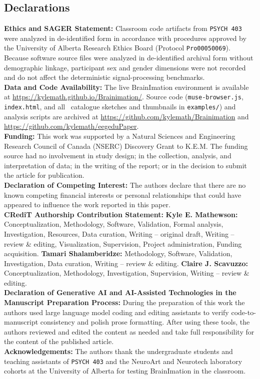 \documentclass[11pt]{article}
\begin{document}
\subsection*{Declarations}
\noindent\textbf{Ethics and SAGER Statement:} Classroom code artifacts from \texttt{PSYCH 403} were analyzed in de-identified form in accordance with procedures approved by the University of Alberta Research Ethics Board (Protocol \texttt{Pro00050069}). Because software source files were analyzed in de-identified archival form without demographic linkage, participant sex and gender dimensions were not recorded and do not affect the deterministic signal-processing benchmarks.\\[2pt]
\noindent\textbf{Data and Code Availability:} The live BrainImation environment is available at \url{https://kylemath.github.io/Brainimation/}. Source code (\texttt{muse-browser.js}, \texttt{index.html}, and all \NCatalogueSketches\ catalogue sketches and thumbnails in \texttt{examples/}) and analysis scripts are archived at \url{https://github.com/kylemath/Brainimation} and \url{https://github.com/kylemath/eegeduPaper}.\\[2pt]
\noindent\textbf{Funding:} This work was supported by a Natural Sciences and Engineering Research Council of Canada (NSERC) Discovery Grant to K.E.M. The funding source had no involvement in study design; in the collection, analysis, and interpretation of data; in the writing of the report; or in the decision to submit the article for publication.\\[2pt]
\noindent\textbf{Declaration of Competing Interest:} The authors declare that there are no known competing financial interests or personal relationships that could have appeared to influence the work reported in this paper.\\[2pt]
\noindent\textbf{CRediT Authorship Contribution Statement:} \textbf{Kyle E. Mathewson:} Conceptualization, Methodology, Software, Validation, Formal analysis, Investigation, Resources, Data curation, Writing -- original draft, Writing -- review \& editing, Visualization, Supervision, Project administration, Funding acquisition. \textbf{Tamari Shalamberidze:} Methodology, Software, Validation, Investigation, Data curation, Writing -- review \& editing. \textbf{Claire J. Scavuzzo:} Conceptualization, Methodology, Investigation, Supervision, Writing -- review \& editing.\\[2pt]
\noindent\textbf{Declaration of Generative AI and AI-Assisted Technologies in the Manuscript Preparation Process:} During the preparation of this work the authors used large language model coding and editing assistants to verify code-to-manuscript consistency and polish prose formatting. After using these tools, the authors reviewed and edited the content as needed and take full responsibility for the content of the published article.\\[2pt]
\noindent\textbf{Acknowledgements:} The authors thank the undergraduate students and teaching assistants of \texttt{PSYCH 403} and the NeuroArt and Neurotech laboratory cohorts at the University of Alberta for testing BrainImation in the classroom.



\end{document}
